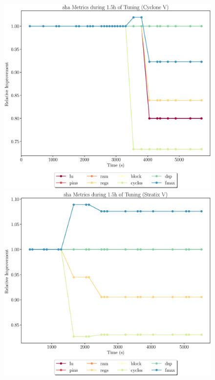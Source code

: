 \documentclass[12pt, a4paper]{article}
\begin{document}
\begin{figure}[htpb]
    \begin{minipage}{.48\textwidth}
        \includegraphics[scale=.25]{sha_all_5400_chstone_CycloneV}
    \end{minipage}%
    \hfill
    \begin{minipage}{.48\textwidth}
        \includegraphics[scale=.25]{sha_all_5400_chstone_StratixV}
    \end{minipage}%


\end{figure}
\end{document}
